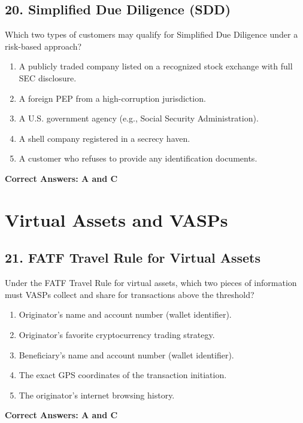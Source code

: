 \documentclass[11pt,a4paper]{article}
\begin{document}
	\subsection{20. Simplified Due Diligence (SDD)}
	Which two types of customers may qualify for Simplified Due Diligence under a risk-based approach?
	\begin{enumerate}[label=\Alph*.]
		\item A publicly traded company listed on a recognized stock exchange with full SEC disclosure.
		\item A foreign PEP from a high-corruption jurisdiction.
		\item A U.S. government agency (e.g., Social Security Administration).
		\item A shell company registered in a secrecy haven.
		\item A customer who refuses to provide any identification documents.
	\end{enumerate}
	\textbf{Correct Answers: A and C}
	
	\section{Virtual Assets and VASPs}
	
	\subsection{21. FATF Travel Rule for Virtual Assets}
	Under the FATF Travel Rule for virtual assets, which two pieces of information must VASPs collect and share for transactions above the threshold?
	\begin{enumerate}[label=\Alph*.]
		\item Originator's name and account number (wallet identifier).
		\item Originator's favorite cryptocurrency trading strategy.
		\item Beneficiary's name and account number (wallet identifier).
		\item The exact GPS coordinates of the transaction initiation.
		\item The originator's internet browsing history.
	\end{enumerate}
	\textbf{Correct Answers: A and C}
	
\end{document}
